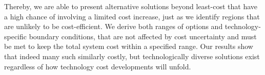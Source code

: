 
Thereby, we are able to present alternative solutions beyond least-cost that
have a high chance of involving a limited cost increase, just as we identify
regions that are unlikely to be cost-efficient. We derive both ranges of options
and technology-specific boundary conditions, that are not affected by cost
uncertainty and must be met to keep the total system cost within a specified
range. Our results show that indeed many such similarly costly, but
technologically diverse solutions exist regardless of how technology cost
developments will unfold.









